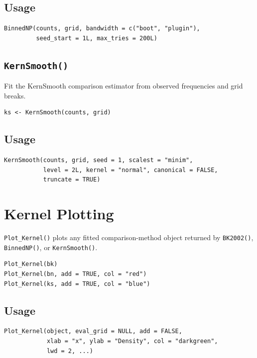 \documentclass[11pt]{article}
\begin{document}
\subsection*{Usage}

\begin{lstlisting}
BinnedNP(counts, grid, bandwidth = c("boot", "plugin"),
         seed_start = 1L, max_tries = 200L)
\end{lstlisting}

\subsection{\texttt{KernSmooth()}}

Fit the KernSmooth comparison estimator from observed frequencies and grid
breaks.

\begin{lstlisting}
ks <- KernSmooth(counts, grid)
\end{lstlisting}

\subsection*{Usage}

\begin{lstlisting}
KernSmooth(counts, grid, seed = 1, scalest = "minim",
           level = 2L, kernel = "normal", canonical = FALSE,
           truncate = TRUE)
\end{lstlisting}

\section{Kernel Plotting}

\texttt{Plot\_Kernel()} plots any fitted comparison-method object returned by
\texttt{BK2002()}, \texttt{BinnedNP()}, or \texttt{KernSmooth()}.

\begin{lstlisting}
Plot_Kernel(bk)
Plot_Kernel(bn, add = TRUE, col = "red")
Plot_Kernel(ks, add = TRUE, col = "blue")
\end{lstlisting}

\subsection*{Usage}

\begin{lstlisting}
Plot_Kernel(object, eval_grid = NULL, add = FALSE,
            xlab = "x", ylab = "Density", col = "darkgreen",
            lwd = 2, ...)
\end{lstlisting}
\end{document}
